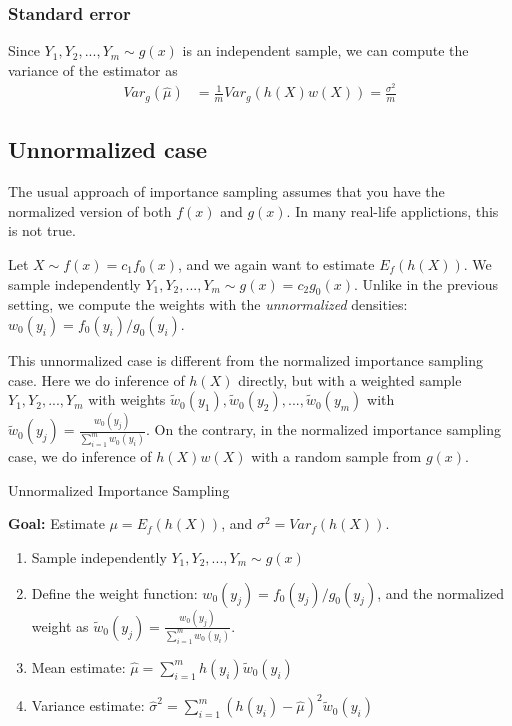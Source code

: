 \documentclass[conference]{IEEEtran}
\newtheorem{myProposition}{Proposition}
\begin{document}
\subsubsection*{Standard error}
Since $Y_1,Y_2,...,Y_m \sim g(x)$ is an independent sample, we can
compute the variance of the estimator as
\begin{align*}
Var_g(\hat{\mu}) &= \frac{1}{m} Var_g(h(X)w(X)) = \frac{\sigma^2}{m}
\end{align*}

\subsection*{Unnormalized case}
The usual approach of importance sampling assumes that you have the
normalized version of both $f(x)$ and $g(x)$. In many real-life
applictions, this is not true.

Let $X \sim f(x) = c_1 f_0(x)$, and we again want to estimate
$E_f(h(X))$. We sample independently $Y_1,Y_2,...,Y_m \sim g(x) = c_2
g_0(x)$.
Unlike in the previous setting, we compute the weights with the
\textit{unnormalized} densities: $w_0(y_i) = f_0(y_i) / g_0(y_i)$.


This unnormalized case is different from the normalized importance
sampling case. Here we do inference of $h(X)$ directly, but
with a weighted sample $Y_1,Y_2,...,Y_m$ with weights
$\tilde{w}_0(y_1),\tilde{w}_0(y_2),...,\tilde{w}_0(y_m)$ with
$\tilde{w}_0(y_j) = \frac{w_0(y_j)}{\sum_{i=1}^m w_0(y_i)}.$ On the
contrary, in the normalized importance sampling case, we do inference
of $h(X)w(X)$ with a random sample from $g(x)$.

\begin{algorithm}
\caption{Unnormalized Importance Sampling}
\textbf{Goal:} Estimate $\mu = E_f(h(X))$, and $\sigma^2 = Var_f(h(X))$.
\begin{enumerate}
\item{Sample independently $Y_1,Y_2,...,Y_m \sim g(x)$}
\item{Define the weight function: $w_0(y_j) = f_0(y_j)/g_0(y_j)$, and
    the normalized weight as $\tilde{w}_0(y_j) =
    \frac{w_0(y_j)}{\sum_{i=1}^m w_0(y_i)}.$}
\item{Mean estimate: $\hat{\mu} = \sum_{i=1}^m
    h(y_i)\tilde{w}_0(y_i)$}
\item{Variance estimate: $\hat{\sigma}^2 = \sum_{i=1}^m
    (h(y_i) - \hat{\mu})^2 \tilde{w}_0(y_i)$}
\end{enumerate}
\end{algorithm}
\end{document}

